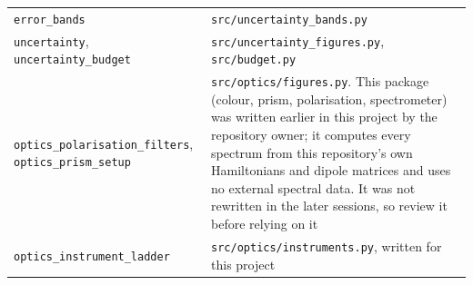 \begin{center}
\begin{tabular}{p{5.2cm}p{9cm}}
\texttt{error\_bands} & \texttt{src/uncertainty\_bands.py}\\
\texttt{uncertainty}, \texttt{uncertainty\_budget} & \texttt{src/uncertainty\_figures.py}, \texttt{src/budget.py}\\
\texttt{optics\_polarisation\_filters}, \texttt{optics\_prism\_setup} & \texttt{src/optics/figures.py}. This package (colour, prism, polarisation, spectrometer) was written earlier in this project by the repository owner; it computes every spectrum from this repository's own Hamiltonians and dipole matrices and uses no external spectral data. It was not rewritten in the later sessions, so review it before relying on it\\
\texttt{optics\_instrument\_ladder} & \texttt{src/optics/instruments.py}, written for this project\\
\bottomrule
\end{tabular}
\end{center}

